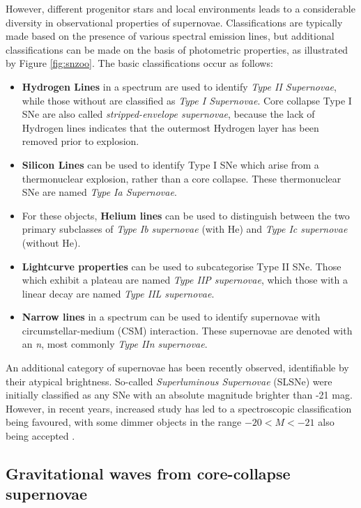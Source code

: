 However, different progenitor stars and local environments leads to a considerable diversity in observational properties of supernovae. Classifications are typically made based on the presence of various spectral emission lines, but additional classifications can be made on the basis of photometric properties, as illustrated by Figure \ref{fig:snzoo}. The basic classifications occur as follows:

\begin{itemize}
	\item \textbf{Hydrogen Lines} in a spectrum are used to identify \emph{Type II Supernovae}, while those without are classified as \emph{Type I Supernovae}. Core collapse Type I SNe are also called \emph{stripped-envelope supernovae}, because the lack of Hydrogen lines indicates that the outermost Hydrogen layer has been removed prior to explosion. 
	\item \textbf{Silicon Lines} can be used to identify Type I SNe which arise from a thermonuclear explosion, rather than a core collapse. These thermonuclear SNe are named \emph{Type Ia Supernovae}.
	\item For these objects, \textbf{Helium lines} can be used to distinguish between the two primary subclasses of \emph{Type Ib supernovae} (with He) and \emph{Type Ic supernovae} (without He).
	\item \textbf{Lightcurve properties} can be used to subcategorise Type II SNe. Those which exhibit a plateau are named \emph{Type IIP supernovae}, which those with a linear decay are named \emph{Type IIL supernovae}.
	\item \textbf{Narrow lines} in a spectrum can be used to identify supernovae with circumstellar-medium (CSM) interaction. These supernovae are denoted with an \emph{n}, most commonly \emph{Type IIn supernovae}.
\end{itemize}

An additional category of supernovae has been recently observed, identifiable by their atypical brightness. So-called \emph{Superluminous Supernovae} (SLSNe) were initially classified as any SNe with an absolute magnitude brighter than -21 mag. However, in recent years, increased study has led to a spectroscopic classification being favoured, with some dimmer objects in the range $-20 < M < -21$ also being accepted . 

\subsection*{Gravitational waves from core-collapse supernovae}

